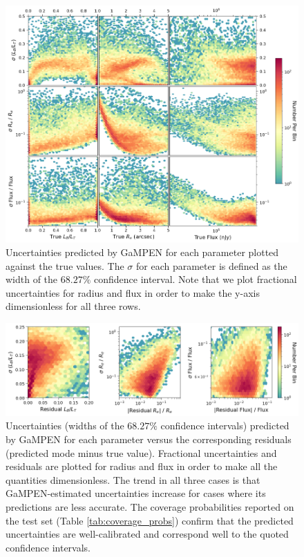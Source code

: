 \documentclass[twocolumn]{aastex63}
\newcommand\gampen{GaMPEN}
\begin{document}
\begin{CJK*}{UTF8}{gbsn}
\begin{figure}[htb]
	\centering
	\includegraphics[width
	=\textwidth]{2d_uncertainty_norm.png}
	\caption{Uncertainties predicted by \gampen{} for each parameter plotted against the true values. The $\sigma$ for each parameter is defined as the width of the $68.27\%$ confidence interval. %
	Note that we plot fractional uncertainties for radius and flux in order to make the y-axis dimensionless for all three rows.}
	\label{fig:2d_uncertainty_hists_norm}
\end{figure}

\begin{figure}[htb]
	\centering
	\includegraphics[width
	=\textwidth]{uncer_resi.png}
	\caption{Uncertainties (widths of the $68.27\%$ confidence intervals)  predicted by \gampen{} for each parameter  versus the corresponding residuals (predicted mode minus true value). Fractional uncertainties and residuals are plotted for radius and flux in order to make all the quantities dimensionless. The trend in all three cases is that \gampen{}-estimated uncertainties increase for cases where its predictions are less accurate. The coverage probabilities reported on the test set (Table \ref{tab:coverage_probs}) confirm that the predicted uncertainties are well-calibrated and correspond well to the quoted confidence intervals.}
	\label{fig:uncer_resi}
\end{figure}


\end{CJK*}
\end{document}
